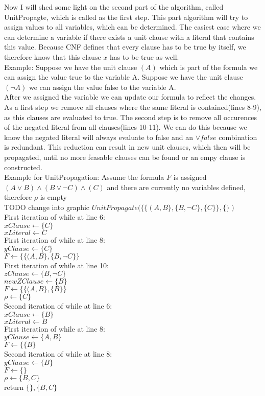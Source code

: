 Now I will shed some light on the second part of the algorithm, called UnitPropagte, which is called as the first step.
This part algorithm will try to assign values to all variables, which can be determined. The easiest case where we can determine a variable if there exists a unit clause with a literal that contains this value. Because CNF defines that every clause has to be true by itself, we therefore know that this clause $x$ has to be true as well.\\ Example: Suppose we have the unit clause $(A)$ which is part of the formula we can assign the value true to the variable A. Suppose we have the unit clause $(\lnot A)$ we can assign the value false to the variable A.\\
After we assigned the variable we can update our formula to reflect the changes. As a first step we remove all clauses where the same literal is contained(lines 8-9), as this clauses are evaluated to true. The second step is to remove all occurences of the negated literal from all clauses(lines 10-11). We can do this because we know the negated literal will always evaluate to false and an $\lor false$ combination is redundant.
This reduction can result in new unit clauses, which then will be propagated, until no more feasable clauses can be found or an empy clause is constructed.\\
Example for UnitPropagation: 
Assume the formula $F$ is assigned $(A \lor B ) \land (B \lor \lnot C) \land (C)$ and there are currently no variables defined, therefore $\rho$ is empty\\
TODO change into graphic
$UnitPropagate(\{\{(A,B\}, \{B, \lnot C\},\{C\}\}, \{\})$\\
First iteration of while at line 6: \\
$xClause \gets \{C\}$\\
$xLiteral \gets C$\\
First iteration of while at line 8:\\
$yClause \gets \{C\}$\\
$F \gets \{\{(A,B\}, \{B, \lnot C\}\}$\\
First iteration of while at line 10:\\
$zClause \gets \{B, \lnot C\}$ \\
$newZClause \gets \{B\}$\\
$F \gets \{\{(A,B\}, \{B\}\}$ \\
$\rho \gets \{C\}$\\
Second iteration of while at line 6: \\
$xClause \gets \{B\}$\\
$xLiteral \gets B$\\
First iteration of while at line 8:\\
$yClause \gets \{A,B\}$\\
$F \gets \{\{B\}$\\
Second iteration of while at line 8:\\
$yClause \gets \{B\}$\\
$F \gets \{\}$\\
$\rho \gets \{B, C\}$\\
return $\{\}, \{B, C\}$



